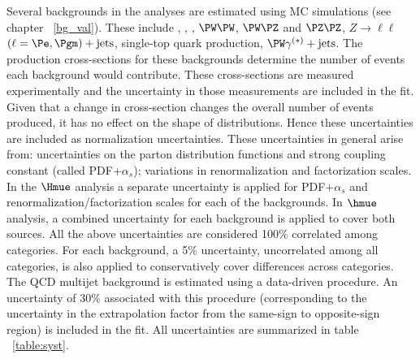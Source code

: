 Several backgrounds in the analyses are estimated using MC simulations (see chapter ~\ref{bg_val}). These include \ztt, \ttb, \wjets, $\PW\PW$, $\PW\PZ$ and $\PZ\PZ$, $Z\to\ell\ell$ $(\ell = \Pe, \Pgm)+\text{jets}$, single-top quark production, $\PW\gamma^{(*)}+\text{jets}$. The production cross-sections for these backgrounds determine the number of events each background would contribute. These cross-sections are measured experimentally and the uncertainty in those measurements are included in the fit. Given that a change in cross-section changes the overall number of events produced, it has no effect on the shape of distributions. Hence these uncertainties are included as normalization uncertainties. These uncertainties in general  arise from: uncertainties on the parton distribution functions and strong coupling constant (called PDF+$\alpha_s$); variations in renormalization and factorization scales. In the $\Hmue$ analysis a separate uncertainty is applied for PDF+$\alpha_s$ and renormalization/factorization scales for each of the backgrounds. In $\hmue$ analysis, a combined uncertainty for each background is applied to cover both sources. All the above uncertainties are considered 100\% correlated among categories. For each background, a 5\% uncertainty, uncorrelated among all categories, is also applied to conservatively cover differences across categories. The QCD multijet background is estimated using a data-driven procedure. An uncertainty of 30\% associated with this procedure (corresponding to the uncertainty in the extrapolation factor from the same-sign to opposite-sign region) is included in the fit. All uncertainties are summarized in table ~\ref{table:syst}.

